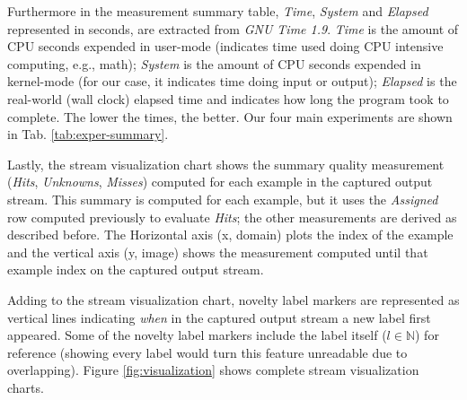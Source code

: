 Furthermore in the measurement summary table, \emph{Time}, \emph{System} and \emph{Elapsed}
 represented in seconds, are extracted from \emph{GNU Time 1.9}.
\emph{Time} is the amount of CPU seconds expended in user-mode
(indicates time used doing CPU intensive computing, e.g., math);
\emph{System} is the amount of CPU seconds expended in kernel-mode
(for our case, it indicates time doing input or output);
\emph{Elapsed} is the real-world (wall clock) elapsed time and
indicates how long the program took to complete.
The lower the times, the better.
Our four main experiments are shown in Tab. \ref{tab:exper-summary}.

Lastly, the stream visualization chart shows the summary quality measurement
(\emph{Hits}, \emph{Unknowns}, \emph{Misses})
computed for each example in the captured output stream.
This summary is computed for each example, but it uses the \emph{Assigned} row
computed previously to evaluate \emph{Hits}; the other measurements are derived as
described before.
The Horizontal axis (x, domain) plots the index of the example and the
vertical axis (y, image) shows the measurement computed until that example index on the captured
output stream.

Adding to the stream visualization chart, novelty label markers are represented
as vertical lines indicating \emph{when} in the captured output stream a new
label first appeared.
Some of the novelty label markers include the label itself ($l \in \mathbb{N}$)
for reference (showing every label would turn this feature unreadable due
to overlapping).
Figure \ref{fig:visualization} shows complete stream visualization charts.

